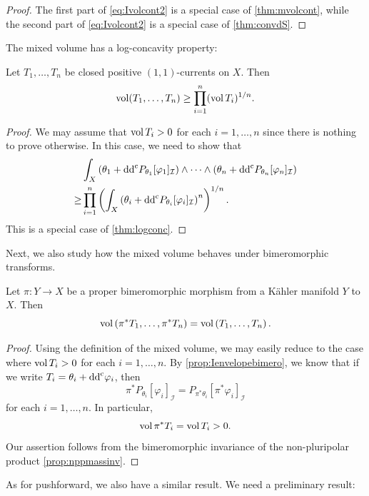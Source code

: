 \begin{proof}
    The first part of \eqref{eq:Ivolcont2} is a special case of \cref{thm:mvolcont}, while the second part of \eqref{eq:Ivolcont2} is a special case of \cref{thm:convdS}.
\end{proof}


The mixed volume has a log-concavity property:
\begin{proposition}\label{prop:logvol}
    Let $T_1,\ldots,T_n$ be closed positive $(1,1)$-currents on $X$. Then
    \[
    \operatorname{vol}(T_1,\ldots,T_n)\geq \prod_{i=1}^n(\operatorname{vol} T_i)^{1/n}.
    \]
\end{proposition}
\begin{proof}
    We may assume that $\operatorname{vol} T_i>0$ for each $i=1,\ldots,n$ since there is nothing to prove otherwise. In this case, we need to show that
    \[
    \begin{split}
    &\int_X \left(\theta_1+\mathrm{dd}^{\mathrm{c}} P_{\theta_1}[\varphi_1]_{\mathcal{I}}\right)\wedge \cdots \wedge \left(\theta_n+\mathrm{dd}^{\mathrm{c}} P_{\theta_n}[\varphi_n]_{\mathcal{I}}\right)\\
    \geq & \prod_{i=1}^n\left(\int_X \left(\theta_i+\mathrm{dd}^{\mathrm{c}} P_{\theta_i}[\varphi_i]_{\mathcal{I}} \right)^n \right)^{1/n}.
    \end{split}
    \]
    This is a special case of \cref{thm:logconc}.
\end{proof}

Next, we also study how the mixed volume behaves under bimeromorphic transforms.
\begin{proposition}\label{prop:biminv}
    Let $\pi\colon Y\rightarrow X$ be a proper bimeromorphic morphism from a Kähler manifold $Y$ to $X$. Then
    \[
    \operatorname{vol}\left(\pi^*T_1,\ldots,\pi^*T_n\right)=\operatorname{vol}\left(T_1,\ldots,T_n\right).
    \]
\end{proposition}
\begin{proof}
    Using the definition of the mixed volume, we may easily reduce to the case where $\operatorname{vol} T_i>0$ for each $i=1,\ldots,n$. By \cref{prop:Ienvelopebimero}, we know that if we write $T_i=\theta_i+\mathrm{dd}^{\mathrm{c}}\varphi_i$, then
    \[
    \pi^*P_{\theta_i}[\varphi_i]_{\mathcal{I}}=P_{\pi^*\theta_i}[\pi^*\varphi_i]_{\mathcal{I}}
    \]
    for each $i=1,\ldots,n$.
    In particular,
    \[
    \operatorname{vol} \pi^*T_i=\operatorname{vol} T_i>0.
    \]
    Our assertion follows from the bimeromorphic invariance of the non-pluripolar product \cref{prop:nppmassinv}.
\end{proof}

As for pushforward, we also have a similar result. We need a preliminary result:

